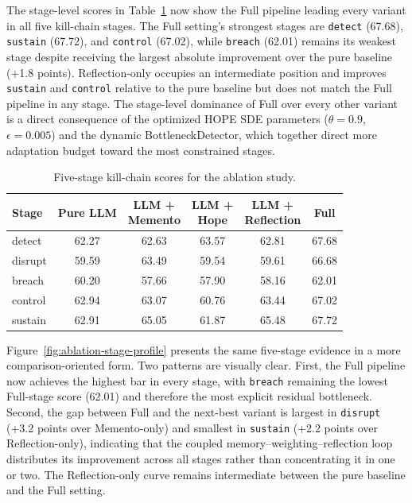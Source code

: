 The stage-level scores in Table~\ref{tab:ablation-stage} now show the Full pipeline leading every variant in all five kill-chain stages. The Full setting's strongest stages are \texttt{detect} (67.68), \texttt{sustain} (67.72), and \texttt{control} (67.02), while \texttt{breach} (62.01) remains its weakest stage despite receiving the largest absolute improvement over the pure baseline (+1.8 points). Reflection-only occupies an intermediate position and improves \texttt{sustain} and \texttt{control} relative to the pure baseline but does not match the Full pipeline in any stage. The stage-level dominance of Full over every other variant is a direct consequence of the optimized HOPE SDE parameters ($\theta=0.9$, $\epsilon=0.005$) and the dynamic BottleneckDetector, which together direct more adaptation budget toward the most constrained stages.

\begin{table}[ht]
\centering
\caption{Five-stage kill-chain scores for the ablation study.}
\label{tab:ablation-stage}
\footnotesize
\setlength{\tabcolsep}{4pt}
\begin{tabular}{lccccc}
\toprule
Stage & Pure LLM & \shortstack{LLM +\\Memento} & \shortstack{LLM +\\Hope} & \shortstack{LLM +\\Reflection} & Full \\
\midrule
detect & 62.27 & 62.63 & 63.57 & 62.81 & 67.68 \\
disrupt & 59.59 & 63.49 & 59.54 & 59.61 & 66.68 \\
breach & 60.20 & 57.66 & 57.90 & 58.16 & 62.01 \\
control & 62.94 & 63.07 & 60.76 & 63.44 & 67.02 \\
sustain & 62.91 & 65.05 & 61.87 & 65.48 & 67.72 \\
\bottomrule
\end{tabular}
\setlength{\tabcolsep}{6pt}
\end{table}

Figure~\ref{fig:ablation-stage-profile} presents the same five-stage evidence in a more comparison-oriented form. Two patterns are visually clear. First, the Full pipeline now achieves the highest bar in every stage, with \texttt{breach} remaining the lowest Full-stage score (62.01) and therefore the most explicit residual bottleneck. Second, the gap between Full and the next-best variant is largest in \texttt{disrupt} (+3.2 points over Memento-only) and smallest in \texttt{sustain} (+2.2 points over Reflection-only), indicating that the coupled memory--weighting--reflection loop distributes its improvement across all stages rather than concentrating it in one or two. The Reflection-only curve remains intermediate between the pure baseline and the Full setting.

